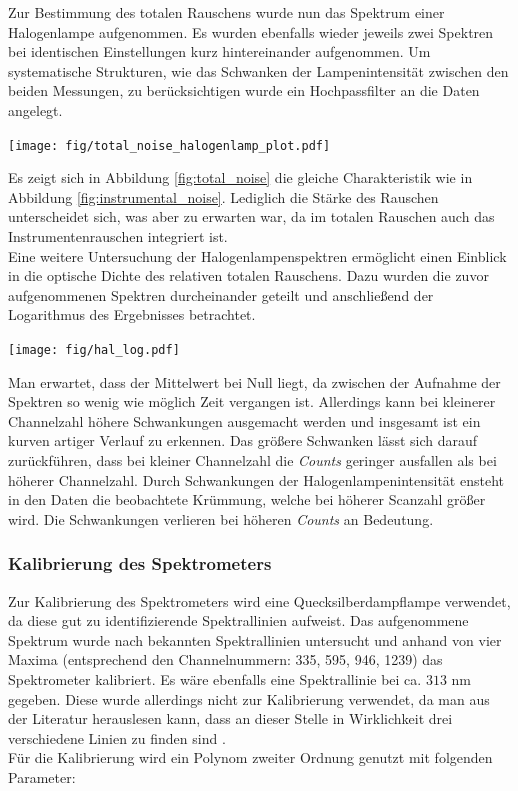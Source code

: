 \documentclass[12pt, a4paper, bibliography=totoc]{scrartcl}
\begin{document}
\begin{multicols}{2}
Zur Bestimmung des totalen Rauschens wurde nun das Spektrum einer Halogenlampe aufgenommen.
Es wurden ebenfalls wieder jeweils zwei Spektren bei identischen Einstellungen kurz hintereinander aufgenommen. 
Um systematische Strukturen, wie das Schwanken der Lampenintensität zwischen den beiden Messungen, zu berücksichtigen wurde ein Hochpassfilter an die Daten angelegt.
\begin{center}
	\texttt{[image: fig/total\_noise\_halogenlamp\_plot.pdf]}
	\label{fig:total_noise}
\end{center}  

Es zeigt sich in Abbildung \ref{fig:total_noise} die gleiche Charakteristik wie in Abbildung \ref{fig:instrumental_noise}. Lediglich die Stärke des Rauschen unterscheidet sich, was aber zu erwarten war, da im totalen Rauschen auch das Instrumentenrauschen integriert ist.
\\
Eine weitere Untersuchung der Halogenlampenspektren ermöglicht einen Einblick in die optische Dichte des relativen totalen Rauschens. Dazu wurden die zuvor aufgenommenen Spektren durcheinander geteilt und anschließend der Logarithmus des Ergebnisses betrachtet.

\begin{center}
    \texttt{[image: fig/hal\_log.pdf]}
    \label{fig:hal_log}
\end{center}


Man erwartet, dass der Mittelwert bei Null liegt, da zwischen der Aufnahme der Spektren so wenig wie möglich Zeit vergangen ist. Allerdings kann bei kleinerer Channelzahl höhere Schwankungen ausgemacht werden und insgesamt ist ein kurven artiger Verlauf zu erkennen.
Das größere Schwanken lässt sich darauf zurückführen, dass bei kleiner Channelzahl die \textit{Counts} geringer ausfallen als bei höherer Channelzahl.
Durch Schwankungen der Halogenlampenintensität ensteht in den Daten die beobachtete Krümmung, welche bei höherer Scanzahl größer wird. Die Schwankungen verlieren bei höheren \textit{Counts} an Bedeutung.

\subsubsection{Kalibrierung des Spektrometers}\label{sssec:calibrating_the_spectrometer}

Zur Kalibrierung des Spektrometers wird eine Quecksilberdampflampe verwendet, da diese gut zu identifizierende Spektrallinien aufweist.
Das aufgenommene Spektrum wurde nach bekannten Spektrallinien untersucht und anhand von vier Maxima (entsprechend den Channelnummern: 335, 595, 946, 1239) das Spektrometer kalibriert. 
Es wäre ebenfalls eine Spektrallinie bei ca. $313$ \si{nm} gegeben. 
Diese wurde allerdings nicht zur Kalibrierung verwendet, da man aus der Literatur herauslesen kann, dass an dieser Stelle in Wirklichkeit drei verschiedene Linien zu finden sind \cite{doas08}.\\
Für die Kalibrierung wird ein Polynom zweiter Ordnung genutzt mit folgenden Parameter: 


\end{multicols}
\end{document}
